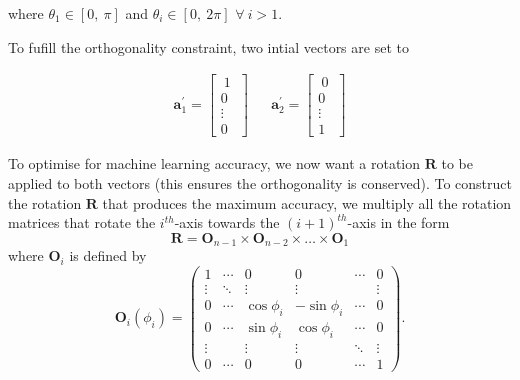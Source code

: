 \documentclass[a4paper,11pt,twoside]{article}
\begin{document}
where $\theta_1 \in [0,\ \pi]$ and $\theta_i \in [0,\ 2\pi]$ $\forall \ i > 1$. 
\newline

To fufill the orthogonality constraint, two intial vectors are set to

\begin{align}
\bm{a}_1^{\prime} = \begin{bmatrix}
           \ 1 \ \\
           0 \\
           \vdots \\
           0
           \end{bmatrix} 
           && 
\bm{a}_2^{\prime} = \begin{bmatrix}
           \ 0 \ \\
           0 \\
           \vdots \\
           1
           \end{bmatrix} 
\end{align}

To  optimise for machine learning accuracy, we now want a rotation $\bm{R}$ to be applied to both vectors (this ensures the orthogonality is conserved). To construct the rotation $\bm{R}$ that produces the maximum accuracy, we multiply all the rotation matrices that rotate the $i^{th}$-axis towards the $(i+1)^{th}$-axis in the form
\begin{equation}
\bm{R}=\bm{O}_{n-1} \times \bm{O}_{n-2} \times \dotsc \times \bm{O}_{1} 
\end{equation}
where $\bm{O}_{i}$ is defined by
\begin{equation}
\bm{O}_i(\phi_i) = 
\begin{pmatrix}
  1 &  \cdots & 0 & 0 & \cdots &  0 \\
  \vdots  &  \ddots & \vdots& \vdots & &\vdots  \\
  0 & \cdots & \cos{\phi_i} & -\sin{\phi_i} &  \cdots & 0 \\
  0 &  \cdots & \sin{\phi_i} & \cos{\phi_i} &  \cdots & 0 \\
  \vdots  &  \ & \vdots& \vdots &\ddots&\vdots  \\
  0 & \cdots & 0 & 0 & \cdots & 1
 \end{pmatrix}.
\end{equation}
\end{document}
